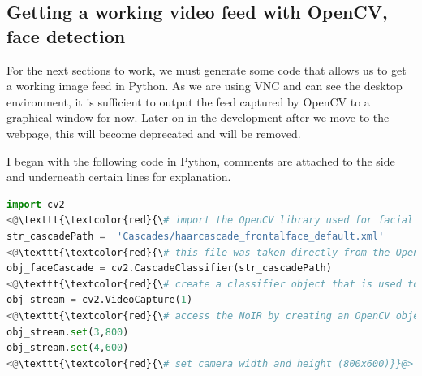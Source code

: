 \documentclass[9pt]{article}
\begin{document}
\newpage
\subsection{Getting a working video feed with OpenCV, face detection}
For the next sections to work, we must generate some code that allows us to get a working image feed in Python. As we are using VNC and can see the desktop environment, it is sufficient to output the feed captured by OpenCV to a graphical window for now. Later on in the development after we move to the webpage, this will become deprecated and will be removed.

I began with the following code in Python, comments are attached to the side and underneath certain lines for explanation.
\begin{lstlisting}[language=Python]
import cv2 
<@\texttt{\textcolor{red}{\# import the OpenCV library used for facial recognition into our code, we can then call all functions in this library}}@>
str_cascadePath =  'Cascades/haarcascade_frontalface_default.xml'
<@\texttt{\textcolor{red}{\# this file was taken directly from the OpenCV GitHub repo}}@>
obj_faceCascade = cv2.CascadeClassifier(str_cascadePath)
<@\texttt{\textcolor{red}{\# create a classifier object that is used to identify faces using the cascade that str\_cascadePath points to}}@> 
obj_stream = cv2.VideoCapture(1)
<@\texttt{\textcolor{red}{\# access the NoIR by creating an OpenCV object that uses the camera}}@> 
obj_stream.set(3,800) 
obj_stream.set(4,600)
<@\texttt{\textcolor{red}{\# set camera width and height (800x600)}}@>


\end{lstlisting}
\end{document}
